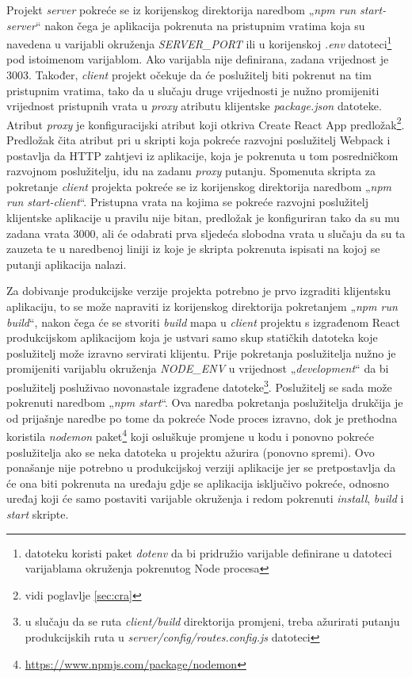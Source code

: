 \documentclass[times, utf8, diplomski, numeric]{fer}
\begin{document}
Projekt \emph{server} pokreće se iz korijenskog direktorija naredbom „\emph{npm run start-server}“ nakon čega je aplikacija pokrenuta na pristupnim vratima  koja su navedena u varijabli okruženja  \emph{SERVER\_PORT} ili u korijenskoj \emph{.env} datoteci\footnote{
    datoteku koristi paket \emph{dotenv} da bi pridružio varijable definirane u datoteci varijablama okruženja pokrenutog Node procesa
} pod istoimenom varijablom.
Ako varijabla nije definirana, zadana vrijednost je 3003.
Također, \emph{client} projekt očekuje da će poslužitelj biti pokrenut na tim pristupnim vratima, tako da u slučaju druge vrijednosti je nužno promijeniti vrijednost pristupnih vrata u \emph{proxy} atributu klijentske \emph{package.json} datoteke.
Atribut \emph{proxy} je konfiguracijski atribut koji otkriva Create React App predložak\footnote{vidi poglavlje \ref{sec:cra}}.
Predložak čita atribut pri u skripti koja pokreće razvojni poslužitelj  Webpack i postavlja da HTTP zahtjevi iz aplikacije, koja je pokrenuta u tom posredničkom  razvojnom poslužitelju, idu na zadanu \emph{proxy} putanju.
Spomenuta skripta za pokretanje \emph{client} projekta pokreće se iz korijenskog direktorija naredbom „\emph{npm run start-client}“.
Pristupna vrata na kojima se pokreće razvojni poslužitelj klijentske aplikacije u pravilu nije bitan, predložak je konfiguriran tako da su mu zadana vrata 3000, ali će odabrati prva sljedeća slobodna vrata u slučaju da su ta zauzeta te u naredbenoj liniji iz koje je skripta pokrenuta ispisati na kojoj se putanji aplikacija nalazi.

Za dobivanje produkcijske verzije projekta potrebno je prvo izgraditi  klijentsku aplikaciju, to se može napraviti iz korijenskog direktorija pokretanjem „\emph{npm run build}“, nakon čega će se stvoriti \emph{build} mapa u \emph{client} projektu s izgrađenom React produkcijskom aplikacijom koja je ustvari samo skup statičkih datoteka koje poslužitelj može izravno servirati klijentu.
Prije pokretanja poslužitelja nužno je promijeniti varijablu okruženja \emph{NODE\_ENV} u vrijednost „\emph{development}“ da bi poslužitelj posluživao novonastale izgrađene datoteke\footnote{
    u slučaju da se ruta \emph{client/build} direktorija promjeni, treba ažurirati putanju produkcijskih ruta u \emph{server/config/routes.config.js} datoteci
}.
Poslužitelj se sada može pokrenuti naredbom „\emph{npm start}“.
Ova naredba pokretanja poslužitelja drukčija je od prijašnje naredbe po tome da pokreće Node proces izravno, dok je prethodna koristila \emph{nodemon} paket\footnote{\url{https://www.npmjs.com/package/nodemon}} koji osluškuje promjene u kodu i ponovno pokreće poslužitelja ako se neka datoteka u projektu ažurira (ponovno spremi).
Ovo ponašanje nije potrebno u produkcijskoj verziji aplikacije jer se pretpostavlja da će ona biti pokrenuta na uređaju gdje se aplikacija isključivo pokreće, odnosno uređaj koji će samo postaviti varijable okruženja i redom pokrenuti \emph{install}, \emph{build} i \emph{start} skripte.
\end{document}
